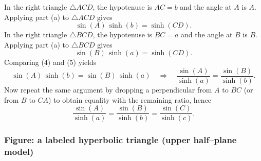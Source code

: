 \documentclass[12pt,a4paper]{article}
\theoremstyle{plain}
\theoremstyle{definition}      %
\begin{document}
	In the right triangle $\triangle ACD$, the hypotenuse is $AC=b$ and the angle at $A$ is $A$.
	Applying part (a) to $\triangle ACD$ gives
	\[
	\sin(A)\,\sinh(b)=\sinh(CD).
	\tag{4}
	\]
	In the right triangle $\triangle BCD$, the hypotenuse is $BC=a$ and the angle at $B$ is $B$.
	Applying part (a) to $\triangle BCD$ gives
	\[
	\sin(B)\,\sinh(a)=\sinh(CD).
	\tag{5}
	\]
	Comparing (4) and (5) yields
	\[
	\sin(A)\,\sinh(b)=\sin(B)\,\sinh(a)
	\quad\Longrightarrow\quad
	\frac{\sin(A)}{\sinh(a)}=\frac{\sin(B)}{\sinh(b)}.
	\]
	Now repeat the same argument by dropping a perpendicular from $A$ to $BC$ (or from $B$ to $CA$)
	to obtain equality with the remaining ratio, hence
	\[
	\frac{\sin(A)}{\sinh(a)}=\frac{\sin(B)}{\sinh(b)}=\frac{\sin(C)}{\sinh(c)}.
	\]
	
	\subsubsection*{Figure: a labeled hyperbolic triangle (upper half–plane model)}
\end{document}
